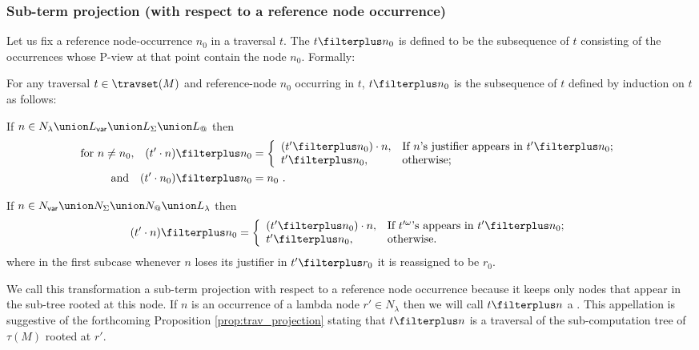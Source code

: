 \subsubsection{Sub-term projection (with respect to a reference node occurrence)}
\label{sec:tstar}
Let us fix a reference node-occurrence $n_0$ in a traversal $t$.
The  $t \filterplus n_0$ is defined to be the subsequence of $t$ consisting of the occurrences
whose P-view at that point contain the node $n_0$. Formally:
\begin{definition}
For any traversal $t\in \travset(M)$ and reference-node $n_0$ occurring in $t$, $t \filterplus n_0$
is the subsequence of $t$ defined by induction on $t$ as follows:
\begin{compactitem}
\item If $n\in N_\lambda \union L_{\sf var} \union L_\Sigma \union L_@$ then
\begin{align*}
\hbox{for $n\neq n_0$,}\quad (t' \cdot n) \filterplus n_0 &= \left\{
                                  \begin{array}{ll}
                                    (t'\filterplus n_0) \cdot n, & \hbox{If $n$'s justifier appears in $t'\filterplus n_0$;} \\
                                    t'\filterplus n_0, & \hbox{otherwise;}
                                  \end{array}
                                \right. \\
\hbox{and}\quad         (t' \cdot n_0) \filterplus n_0& = n_0 \ .
\end{align*}

\item If $n \in N_{\sf var} \union N_\Sigma \union N_@ \union L_\lambda$ then
$$
(t' \cdot n) \filterplus n_0 = \left\{
                                  \begin{array}{ll}
                                    (t'\filterplus n_0) \cdot n, & \hbox{If $t'^\omega$'s appears in $t'\filterplus n_0$;} \\
                                    t'\filterplus n_0, & \hbox{otherwise.}
                                  \end{array}
                                \right.
$$
where in the first subcase whenever $n$ loses its justifier in
$t'\filterplus r_0$ it is reassigned to be $r_0$.
\end{compactitem}
\end{definition}

We call this transformation a sub-term projection with respect to a reference node occurrence because it keeps only nodes
that appear in the sub-tree rooted at this node. If $n$ is an occurrence of a lambda node $r' \in N_\lambda$ then we
will call $t \filterplus n$ a . This appellation is suggestive of the
forthcoming Proposition \ref{prop:trav_projection} stating that $t
\filterplus n$ is a traversal of the sub-computation tree of
$\tau(M)$ rooted at $r'$.
\bigskip



